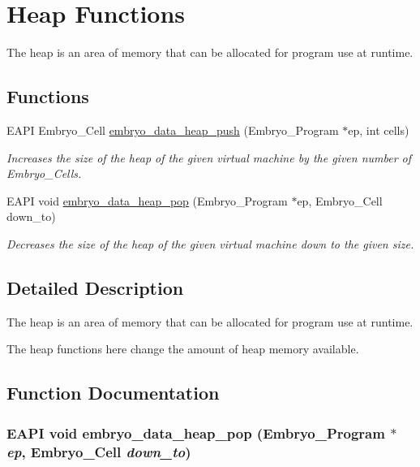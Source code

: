 \hypertarget{group__Embryo__Heap__Group}{
\section{Heap Functions}
\label{group__Embryo__Heap__Group}
}
The heap is an area of memory that can be allocated for program use at runtime.  
\subsection*{Functions}
\begin{CompactItemize}
\item 
EAPI Embryo\_\-Cell \hyperlink{group__Embryo__Heap__Group_g9dc1279d6ed98dfd66bed904e2dfadec}{embryo\_\-data\_\-heap\_\-push} (Embryo\_\-Program $\ast$ep, int cells)
\begin{CompactList}\small\item\em Increases the size of the heap of the given virtual machine by the given number of Embryo\_\-Cells. \item\end{CompactList}\item 
EAPI void \hyperlink{group__Embryo__Heap__Group_gba1369c72afa0acb6e437ef6923dae63}{embryo\_\-data\_\-heap\_\-pop} (Embryo\_\-Program $\ast$ep, Embryo\_\-Cell down\_\-to)
\begin{CompactList}\small\item\em Decreases the size of the heap of the given virtual machine down to the given size. \item\end{CompactList}\end{CompactItemize}


\subsection{Detailed Description}
The heap is an area of memory that can be allocated for program use at runtime. 

The heap functions here change the amount of heap memory available. 

\subsection{Function Documentation}
\hypertarget{group__Embryo__Heap__Group_gba1369c72afa0acb6e437ef6923dae63}{
\subsubsection{\setlength{\rightskip}{0pt plus 5cm}EAPI void embryo\_\-data\_\-heap\_\-pop (Embryo\_\-Program $\ast$ {\em ep}, \/  Embryo\_\-Cell {\em down\_\-to})}}
\label{group__Embryo__Heap__Group_gba1369c72afa0acb6e437ef6923dae63}


